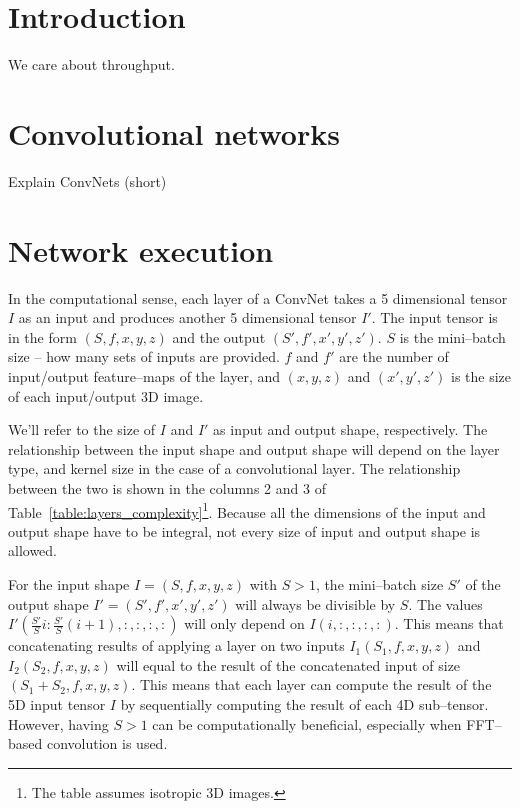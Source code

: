 \documentclass[conference]{IEEEtran}
\begin{document}

\section{Introduction}


We care about throughput.

\section{Convolutional networks}

Explain ConvNets (short)

\section{Network execution}

  In the computational sense, each layer of a ConvNet takes a 5
  dimensional tensor $I$ as an input and produces another 5
  dimensional tensor $I'$.  The input tensor is in the form
  $(S,f,x,y,z)$ and the output $(S',f',x',y',z')$.  $S$ is the
  mini--batch size -- how many sets of inputs are provided.  $f$ and
  $f'$ are the number of input/output feature--maps of the layer, and
  $(x,y,z)$ and $(x',y',z')$ is the size of each input/output 3D
  image.

  We'll refer to the size of $I$ and $I'$ as input and output shape,
  respectively.  The relationship between the input shape and output
  shape will depend on the layer type, and kernel size in the case of
  a convolutional layer.  The relationship between the two is shown in
  the columns 2 and 3 of
  Table~\ref{table:layers_complexity}\footnote{The table assumes
    isotropic 3D images.}.  Because all the dimensions of the input
  and output shape have to be integral, not every size of input and
  output shape is allowed.

  For the input shape $I = (S,f,x,y,z)$ with $S > 1$, the mini--batch
  size $S'$ of the output shape $I' = (S',f',x',y',z')$ will always be
  divisible by $S$.  The values $I'(\frac{S'}{S} i : \frac{S'}{S}
  (i+1),:,:,:,:)$ will only depend on $I(i,:,:,:,:)$.  This means that
  concatenating results of applying a layer on two inputs
  $I_1(S_1,f,x,y,z)$ and $I_2(S_2,f,x,y,z)$ will equal to the result
  of the concatenated input of size $(S_1+S_2,f,x,y,z)$.  This means
  that each layer can compute the result of the 5D input tensor $I$ by
  sequentially computing the result of each 4D sub--tensor.  However,
  having $S > 1$ can be computationally beneficial, especially when
  FFT--based convolution is used.
\end{document}
